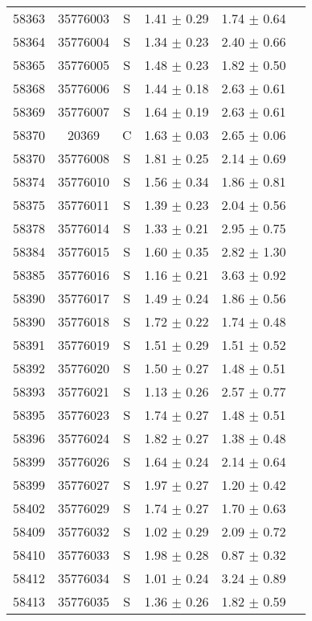\begin{center}
\begin{longtable}{cccccc}
58363 & 35776003 & S & 1.41 $\pm$ 0.29 & 1.74 $\pm$ 0.64 & \\
58364 & 35776004 & S & 1.34 $\pm$ 0.23 & 2.40 $\pm$ 0.66 & \\
58365 & 35776005 & S & 1.48 $\pm$ 0.23 & 1.82 $\pm$ 0.50 & \\
58368 & 35776006 & S & 1.44 $\pm$ 0.18 & 2.63 $\pm$ 0.61 & \\
58369 & 35776007 & S & 1.64 $\pm$ 0.19 & 2.63 $\pm$ 0.61 & \\
58370 & 20369 & C & 1.63 $\pm$ 0.03 & 2.65 $\pm$ 0.06 & \\
58370 & 35776008 & S & 1.81 $\pm$ 0.25 & 2.14 $\pm$ 0.69 & \\
58374 & 35776010 & S & 1.56 $\pm$ 0.34 & 1.86 $\pm$ 0.81 & \\
58375 & 35776011 & S & 1.39 $\pm$ 0.23 & 2.04 $\pm$ 0.56 & \\
58378 & 35776014 & S & 1.33 $\pm$ 0.21 & 2.95 $\pm$ 0.75 & \\
58384 & 35776015 & S & 1.60 $\pm$ 0.35 & 2.82 $\pm$ 1.30 & \\
58385 & 35776016 & S & 1.16 $\pm$ 0.21 & 3.63 $\pm$ 0.92 & \\
58390 & 35776017 & S & 1.49 $\pm$ 0.24 & 1.86 $\pm$ 0.56 & \\
58390 & 35776018 & S & 1.72 $\pm$ 0.22 & 1.74 $\pm$ 0.48 & \\
58391 & 35776019 & S & 1.51 $\pm$ 0.29 & 1.51 $\pm$ 0.52 & \\
58392 & 35776020 & S & 1.50 $\pm$ 0.27 & 1.48 $\pm$ 0.51 & \\
58393 & 35776021 & S & 1.13 $\pm$ 0.26 & 2.57 $\pm$ 0.77 & \\
58395 & 35776023 & S & 1.74 $\pm$ 0.27 & 1.48 $\pm$ 0.51 & \\
58396 & 35776024 & S & 1.82 $\pm$ 0.27 & 1.38 $\pm$ 0.48 & \\
58399 & 35776026 & S & 1.64 $\pm$ 0.24 & 2.14 $\pm$ 0.64 & \\
58399 & 35776027 & S & 1.97 $\pm$ 0.27 & 1.20 $\pm$ 0.42 & \\
58402 & 35776029 & S & 1.74 $\pm$ 0.27 & 1.70 $\pm$ 0.63 & \\
58409 & 35776032 & S & 1.02 $\pm$ 0.29 & 2.09 $\pm$ 0.72 & \\
58410 & 35776033 & S & 1.98 $\pm$ 0.28 & 0.87 $\pm$ 0.32 & \\
58412 & 35776034 & S & 1.01 $\pm$ 0.24 & 3.24 $\pm$ 0.89 & \\
58413 & 35776035 & S & 1.36 $\pm$ 0.26 & 1.82 $\pm$ 0.59 & \\

\end{longtable}
\end{center}
